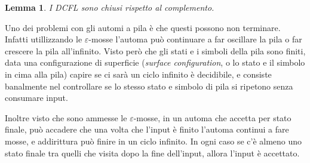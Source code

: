 \documentclass[12pt]{report}
\newtheorem{lemma}{Lemma}
\theoremstyle{definition}
\begin{document}
\begin{lemma}
	I DCFL sono chiusi rispetto al complemento.
\end{lemma}
Uno dei problemi con gli automi a pila è che questi possono non terminare.
Infatti utillizzando le $\varepsilon$-mosse l'automa può continuare a far oscillare la pila o far crescere la pila all'infinito.
Visto però che gli stati e i simboli della pila sono finiti, data una configurazione di superficie (\textit{surface configuration}, o lo stato e il simbolo in cima alla pila) capire se ci sarà un ciclo infinito è decidibile, e consiste banalmente nel controllare se lo stesso stato e simbolo di pila si ripetono senza consumare input.

Inoltre visto che sono ammesse le $\varepsilon$-mosse, in un automa che accetta per stato finale, può accadere che una volta che l'input è finito l'automa continui a fare mosse, e addirittura può finire in un ciclo infinito.
In ogni caso se c'è almeno uno stato finale tra quelli che visita dopo la fine dell'input, allora l'input è accettato.
\end{document}
